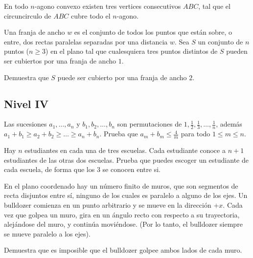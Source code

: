 \documentclass[11pt]{scrartcl}
\newcommand{\thmdifficulty}{0}
\newcommand{\problemdiff}[1]{\renewcommand{\thmdifficulty}{#1}}
\begin{document}
\problemdiff{5}
\begin{problem}
    En todo $n$-agono convexo existen tres vertices consecutivos $ABC$, tal que el circuncirculo de $ABC$ cubre todo el $n$-agono.
\end{problem}

\problemdiff{5}
\begin{problem} %
    Una franja de ancho $w$ es el conjunto de todos los puntos que están sobre, o entre, dos rectas paralelas separadas por una distancia $w$. Sea $S$ un conjunto de $n$ puntos ($n \ge 3$) en el plano tal que cualesquiera tres puntos distintos de $S$ pueden ser cubiertos por una franja de ancho $1$.

Demuestra que $S$ puede ser cubierto por una franja de ancho $2$.
\end{problem}

\subsection{Nivel IV}

\begin{problem}
Las sucesiones $a_1,\ldots, a_n$ y $b_1,b_2, \ldots, b_n$ son permutaciones de $1, \frac 12, \frac 13, \ldots, \frac 1n$, además $a_1+b_1 \geq a_2+b_2\geq \ldots \geq a_n+b_n$. Prueba que $a_m+b_m \leq \frac 4m$ para todo $1 \leq m \leq n$.
\end{problem}

\begin{problem}
Hay $n$ estudiantes en cada una de tres escuelas. Cada estudiante conoce a $n+1$ estudiantes de las otras dos escuelas. Prueba que puedes escoger un estudiante de cada escuela, de forma que los 3 se conocen entre si.
\end{problem}

\problemdiff{6}
\begin{problem} %
    En el plano coordenado hay un número finito de muros, que son segmentos de recta disjuntos entre sí, ninguno de los cuales es paralelo a alguno de los ejes. Un bulldozer comienza en un punto arbitrario y se mueve en la dirección $+x$. Cada vez que golpea un muro, gira en un ángulo recto con respecto a su trayectoria, alejándose del muro, y continúa moviéndose. (Por lo tanto, el bulldozer siempre se mueve paralelo a los ejes).

Demuestra que es imposible que el bulldozer golpee ambos lados de cada muro.
\end{problem}
\end{document}
